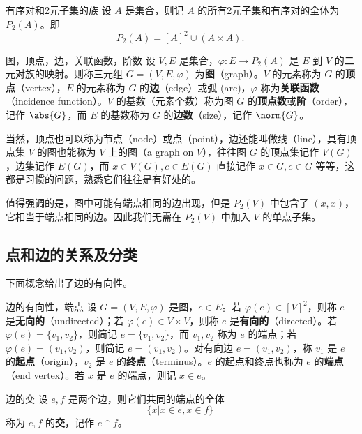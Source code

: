 \begin{definition}{有序对和2元子集的族}
设 $A$ 是集合，则记 $A$ 的所有2元子集和有序对的全体为 $P_2(A)$。即
\begin{equation}
P_2(A)=[A]^2\cup (A\times A).~
\end{equation}

\end{definition}


\begin{definition}{图，顶点，边，关联函数，阶数}
设 $V,E$ 是集合，$\varphi:E\rightarrow P_2(A)$ 是 $E$ 到 $V$ 的二元对族的映射。则称三元组 $G=(V,E,\varphi)$ 为\textbf{图}（graph）。$V$ 的元素称为 $G$ 的\textbf{顶点}（vertex），$E$ 的元素称为 $G$ 的\textbf{边}（edge）或弧 (arc)，$\varphi$ 称为\textbf{关联函数}（incidence function）。$V$ 的基数（元素个数）称为图 $G$ 的\textbf{顶点数}或\textbf{阶}（order），记作 $\abs{G}$，而 $E$ 的基数称为 $G$ 的\textbf{边数}（size），记作 $\norm{G}$。
\end{definition}


当然，顶点也可以称为节点（node）或点（point），边还能叫做线（line），具有顶点集 $V$ 的图也能称为 $V$ 上的图（a graph on $V$），往往图 $G$ 的顶点集记作 $V(G)$，边集记作 $E(G)$，而 $x\in V(G),e\in E(G)$ 直接记作 $x\in G,e\in G$ 等等，这都是习惯的问题，熟悉它们往往是有好处的。

值得强调的是，图中可能有端点相同的边出现，但是 $P_2(V)$ 中包含了 $(x,x)$，它相当于端点相同的边。因此我们无需在 $P_2(V)$ 中加入 $V$ 的单点子集。

\subsection{点和边的关系及分类}


下面概念给出了边的有向性。
\begin{definition}{边的有向性，端点}
设 $G=(V,E,\varphi)$ 是图，$e\in E$。若 $\varphi(e)\in[V]^2$，则称 $e$ 是\textbf{无向的}（undirected）；若 $\varphi(e)\in V\times V$，则称 $e$ 是\textbf{有向的}（directed）。若 $\varphi(e)=\{v_1,v_2\}$，则简记 $e=\{v_1,v_2\}$，而 $v_1,v_2$ 称为 $e$ 的端点；若 $\varphi(e)=(v_1,v_2)$，则简记 $e=(v_1,v_2)$。对有向边 $e=(v_1,v_2)$，称 $v_1$ 是 $e$ 的\textbf{起点}（origin），$v_2$ 是 $e$ 的\textbf{终点}（terminus）。$e$ 的起点和终点也称为 $e$ 的\textbf{端点}（end vertex）。若 $x$ 是 $e$ 的端点，则记 $x\in e$。
\end{definition}

\begin{definition}{边的交}
设 $e,f$ 是两个边，则它们共同的端点的全体
\begin{equation}
\{x|x\in e,x\in f\}~
\end{equation}
称为 $e,f$ 的\textbf{交}，记作 $e\cap f$。
\end{definition}

